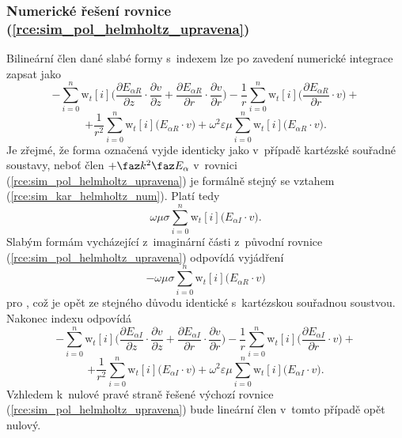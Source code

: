 \subsubsection*{Numerické řešení rovnice (\ref{rce:sim_pol_helmholtz_upravena})}
Bilineární člen dané slabé formy s~indexem  lze po zavedení numerické integrace zapsat jako
\begin{displaymath}
-\sum_{i=0}^{n}\mathrm{w}_{t}[i]\bigg(\frac{\partial E_{\alpha R}}{\partial z}\cdot \frac{\partial v}{\partial z} + \frac{\partial E_{\alpha R}}{\partial r}\cdot \frac{\partial v}{\partial r} \bigg) - \frac{1}{r}\sum_{i=0}^{n}\mathrm{w}_{t}[i]\bigg(\frac{\partial E_{\alpha R}}{\partial r}\cdot v\bigg) +
\end{displaymath}
\begin{equation}
	 + \frac{1}{r^{2}}\sum_{i=0}^{n}\mathrm{w}_{t}[i]\bigg(E_{\alpha R}\cdot v\bigg) + \omega^{2}\varepsilon\mu\sum_{i=0}^{n}\mathrm{w}_{t}[i]\bigg(E_{\alpha R}\cdot v\bigg).
	\label{rce:sim_pol_bilinear_real_real} 
\end{equation}
Je zřejmé, že forma označená  vyjde identicky jako v~případě kartézské souřadné soustavy, neboť člen $+\faz k^{2}\faz E_{\alpha}$ v~rovnici (\ref{rce:sim_pol_helmholtz_upravena}) je formálně stejný se vztahem (\ref{rce:sim_kar_helmholtz_num}). Platí tedy
\begin{equation}
 \omega\mu\sigma\sum_{i=0}^{n}\mathrm{w}_{t}[i]\bigg(E_{\alpha I}\cdot v\bigg).
	\label{rce:sim_pol_bilinear_real_imag} 
\end{equation}
Slabým formám vycházející z~imaginární části z~původní rovnice (\ref{rce:sim_pol_helmholtz_upravena}) odpovídá vyjádření
\begin{equation}
 -\omega\mu\sigma\sum_{i=0}^{n}\mathrm{w}_{t}[i]\bigg(E_{\alpha R}\cdot v\bigg)
	\label{rce:sim_pol_bilinear_imag_imag} 
\end{equation}
pro , což je opět ze stejného důvodu identické s~kartézskou souřadnou soustvou. Nakonec indexu  odpovídá
\begin{displaymath}
-\sum_{i=0}^{n}\mathrm{w}_{t}[i]\bigg(\frac{\partial E_{\alpha I}}{\partial z}\cdot \frac{\partial v}{\partial z} + \frac{\partial E_{\alpha I}}{\partial r}\cdot \frac{\partial v}{\partial r} \bigg) - \frac{1}{r}\sum_{i=0}^{n}\mathrm{w}_{t}[i]\bigg(\frac{\partial E_{\alpha I}}{\partial r}\cdot v\bigg) +
\end{displaymath}
\begin{equation}
	 + \frac{1}{r^{2}}\sum_{i=0}^{n}\mathrm{w}_{t}[i]\bigg(E_{\alpha I}\cdot v\bigg) + \omega^{2}\varepsilon\mu\sum_{i=0}^{n}\mathrm{w}_{t}[i]\bigg(E_{\alpha I}\cdot v\bigg).
	\label{rce:sim_pol_bilinear_real_real} 
\end{equation}
Vzhledem k~nulové pravé straně řešené výchozí rovnice (\ref{rce:sim_pol_helmholtz_upravena}) bude lineární člen  v~tomto případě opět nulový.





